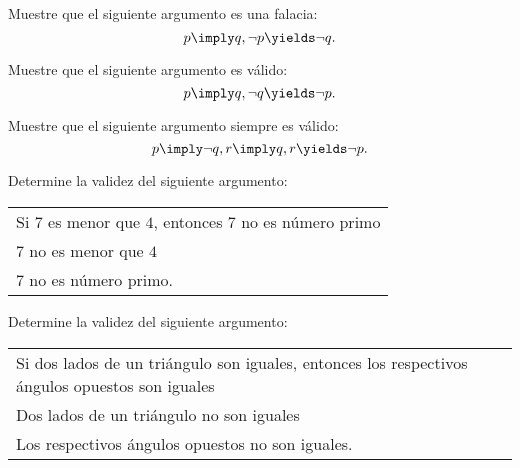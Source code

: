 

\begin{problema}
	Muestre que el siguiente argumento es una falacia:
	$$
	p\imply q, \neg p \yields \neg q.
	$$
\end{problema}




\begin{problema}
	Muestre que el siguiente argumento es válido:
	$$
	p\imply q, \neg q \yields \neg p.
	$$
\end{problema}




\begin{problema}
	Muestre que el siguiente argumento siempre es válido:
	$$
	p \imply \neg q, r \imply q, r \yields \neg p.
	$$
\end{problema}




\begin{problema}
	Determine la validez del siguiente argumento:
	\begin{center}
		\begin{tabular}{l}
			Si $7$ es menor que $4$, entonces $7$ no es número primo\\
			$7$ no es menor que $4$\\\hline
			$7$ no es número primo.
		\end{tabular}
	\end{center}
	
\end{problema}




\begin{problema}
	Determine la validez del siguiente argumento:
	\begin{center}
		\begin{tabular}{l}
			Si dos lados de un triángulo son iguales, entonces los respectivos ángulos opuestos son iguales\\
			Dos lados de un triángulo no son iguales\\\hline
			Los respectivos ángulos opuestos no son iguales.
		\end{tabular}
	\end{center}
	
\end{problema}



